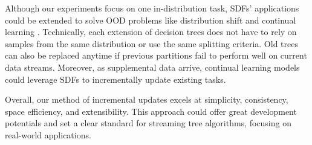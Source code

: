Although our experiments focus on one in-distribution task, SDFs' applications could be extended to solve OOD problems like distribution shift and continual learning \citep{geisa_towards_2021, van_de_ven_three_2019}. 
Technically, each extension of decision trees does not have to rely on samples from the same distribution or use the same splitting criteria. Old trees can also be replaced anytime if previous partitions fail to perform well on current data streams. 
Moreover, as supplemental data arrive, continual learning models could leverage SDFs to incrementally update existing tasks.

Overall, our method of incremental updates excels at simplicity, consistency, space efficiency, and extensibility. This approach could offer great development potentials and set a clear standard for streaming tree algorithms, focusing on real-world applications.
